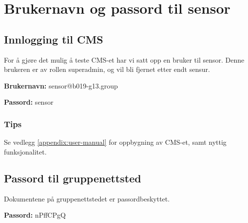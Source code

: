 \cleardoublepage
\chapter{Brukernavn og passord til sensor}
\label{appendix:login-cms} 

\section{Innlogging til CMS}
For å gjøre det mulig å teste CMS-et har vi satt opp en bruker til sensor. Denne brukeren er av rollen superadmin, og vil bli fjernet etter endt sensur.

\textbf{Brukernavn:}
sensor@b019-g13.group

\textbf{Passord:}
sensor

\subsection{Tips}
Se vedlegg \ref{appendix:user-manual} for oppbygning av CMS-et, samt nyttig funksjonalitet.

\section{Passord til gruppenettsted}
Dokumentene på gruppenettstedet er passordbeskyttet.

\textbf{Passord:}
nPffCPgQ
